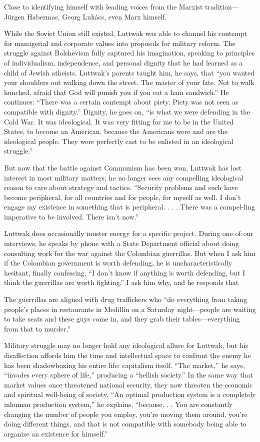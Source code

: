  \par 
Close to identifying himself with leading voices from the Marxist tradition—Jürgen Habermas, Georg Lukács, even Marx himself.
 \par 
While the Soviet Union still existed, Luttwak was able to channel his contempt for managerial and corporate values into proposals for military reform. The struggle against Bolshevism fully captured his imagination, speaking to principles of individualism, independence, and personal dignity that he had learned as a child of Jewish atheists. Luttwak’s parents taught him, he says, that “you wanted your shoulders out walking down the street. The master of your fate. Not to walk hunched, afraid that God will punish you if you eat a ham sandwich.” He continues: “There was a certain contempt about piety. Piety was not seen as compatible with dignity.” Dignity, he goes on, “is what we were defending in the Cold War. It was ideological. It was very fitting for me to be in the United States, to become an American, because the Americans were and are the ideological people. They were perfectly cast to be enlisted in an ideological struggle.”
 \par 
But now that the battle against Communism has been won, Luttwak has lost interest in most military matters; he no longer sees any compelling ideological reason to care about strategy and tactics. “Security problems and such have become peripheral, for all countries and for people, for myself as well. I don’t engage my existence in something that is peripheral. . . . There was a compel-ling imperative to be involved. There isn’t now.”
 \par 
Luttwak does occasionally muster energy for a specific project. During one of our interviews, he speaks by phone with a State Department official about doing consulting work for the war against the Colombian guerrillas. But when I ask him if the Colombian government is worth defending, he is uncharacteristically hesitant, finally confessing, “I don’t know if anything is worth defending, but I think the guerrillas are worth fighting.” I ask him why, and he responds that
 \par 
The guerrillas are aligned with drug traffickers who “do everything from taking people’s places in restaurants in Medillín on a Saturday night—people are waiting to take seats and these guys come in, and they grab their tables—everything from that to murder.”
 \par 
Military struggle may no longer hold any ideological allure for Luttwak, but his disaffection affords him the time and intellectual space to confront the enemy he has been shadowboxing his entire life: capitalism itself. “The market,” he says, “invades every sphere of life,” producing a “hellish society.” In the same way that market values once threatened national security, they now threaten the economic and spiritual well-being of society. “An optimal production system is a completely inhuman production system,” he explains, “because. . . You are constantly changing the number of people you employ, you’re moving them around, you’re doing different things, and that is not compatible with somebody being able to organize an existence for himself.”
